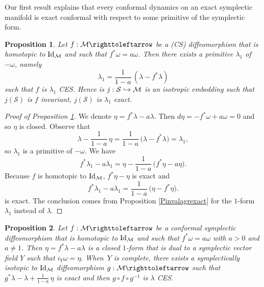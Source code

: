 \documentclass[JEP,XML,SOM,Unicode,published]{cedram}
\def\hto{\mathrel{\lhook\joinrel\to}}
\newtheorem{proposition}{Proposition}
\theoremstyle{definition}
\def\cM{{\mathcal M}}
\def\cS{{\mathcal S}}
\begin{document}
Our first result explains that every conformal dynamics on an exact symplectic manifold is exact conformal with respect to some primitive of the symplectic form.

\begin{proposition}\label{PLiouvillembedding}
Let $f: \cM \righttoleftarrow$ be a (CS) diffeomorphism that is homotopic to ${\rm Id}_{\cM}$ and such that $f^*\omega=a\omega$. Then there exists a primitive $\lambda_1$ of $-\omega$, namely\vspace*{-3pt}
\[
\lambda_1=\frac{1}{1-a}\,(\lambda-f^*\lambda)
\]
such that $f$ is $\lambda_1$ CES. Hence is $j:\cS\hto\cM$ is an isotropic embedding such that $j(\cS)$ is $f$ invariant, $j(\cS)$ is $\lambda_1$ exact.
\end{proposition}

\begin{proof}[Proof of Proposition \ref{PLiouvillembedding}]
We denote $\eta=f^*\lambda-a\lambda$. Then $d\eta=-f^*\omega+a\omega=0$ and so $\eta$ is closed. Observe that\vspace*{-3pt}
\[
\lambda-\frac{1}{1-a}\,\eta=\frac{1}{1-a}\,\big(\lambda-f^*\lambda)=\lambda_1,
\]
so $\lambda_1$ is a primitive of $-\omega$. We have\vspace*{-3pt}
\[
f^*\lambda_1-a\lambda_1=\eta-\frac{1}{1-a}\,\big(f^*\eta-a\eta\big).
\]
Because $f$ is homotopic to ${\rm Id}_\cM$, $f^*\eta-\eta$ is exact and\vspace*{-3pt}
\[
f^*\lambda_1-a\lambda_1=\frac{1}{1-a}\,\big( \eta-f^*\eta\big).
\]
is exact. The conclusion comes from Proposition \ref{Pinvalagrexact} for the $1$-form $\lambda_1$ instead of $\lambda$.
\end{proof}

\begin{proposition}\label{PCES}
Let $f: \cM \righttoleftarrow$ be a conformal symplectic diffeomorphism that is homotopic to ${\rm Id}_\cM$ and such that $f^*\omega=a\omega$ with $a>0$ and $a\not=1$. Then $\eta=f^*\lambda-a\lambda$ is a closed $1$-form that is dual to a symplectic vector field $Y$ such that $i_Y\omega=\eta.$ When~$Y$ is complete, there exists a symplectically isotopic to ${\rm Id}_\cM$ diffeomorphism $g: \cM \righttoleftarrow$ such that $g^*\lambda-\lambda +\frac{1}{1-a}\,\eta$ is exact and then $g\circ f\circ g^{-1}$ is $\lambda$ CES.
\end{proposition}
\end{document}

